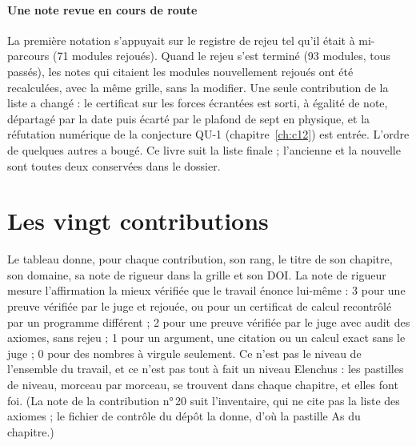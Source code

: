 \paragraph{Une note revue en cours de route} La première notation s'appuyait sur le registre de rejeu tel qu'il
était à mi-parcours (71 modules rejoués). Quand le rejeu s'est terminé (93 modules, tous passés), les notes qui
citaient les modules nouvellement rejoués ont été recalculées, avec la même grille, sans la modifier. Une seule
contribution de la liste a changé : le certificat sur les forces écrantées est sorti, à égalité de note, départagé
par la date puis écarté par le plafond de sept en physique, et la réfutation numérique de la conjecture QU-1
(chapitre~\ref{ch:c12}) est entrée. L'ordre de quelques autres a bougé. Ce livre suit la liste finale ; l'ancienne
et la nouvelle sont toutes deux conservées dans le dossier.

\section{Les vingt contributions}

Le tableau donne, pour chaque contribution, son rang, le titre de son chapitre, son domaine, sa note de rigueur dans
la grille et son DOI. La note de rigueur mesure l'affirmation la mieux vérifiée que le travail énonce lui-même : 3
pour une preuve vérifiée par le juge et rejouée, ou pour un certificat de calcul recontrôlé par un programme
différent ; 2 pour une preuve vérifiée par le juge avec audit des axiomes, sans rejeu ; 1 pour un argument, une
citation ou un calcul exact sans le juge ; 0 pour des nombres à virgule seulement. Ce n'est pas le niveau de
l'ensemble du travail, et ce n'est pas tout à fait un niveau Elenchus : les pastilles de niveau, morceau par morceau,
se trouvent dans chaque chapitre, et elles font foi. (La note de la contribution n°\,20 suit l'inventaire, qui ne
cite pas la liste des axiomes ; le fichier de contrôle du dépôt la donne, d'où la pastille As du chapitre.)

\begingroup
\small
\renewcommand{\arraystretch}{1.22}

\endgroup
